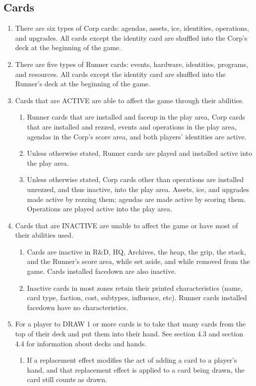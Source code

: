 \subsection{Cards}
\begin{enumerate}
	\item There are six types of Corp cards: agendas, assets, ice, identities, operations, and upgrades. All cards except the identity card are shuffled into the Corp's deck at the beginning of the game.
	\item There are five types of Runner cards: events, hardware, identities, programs, and resources. All cards except the identity card are shuffled into the Runner's deck at the beginning of the game.
	\item Cards that are ACTIVE are able to affect the game through their abilities.
	      \begin{enumerate}
		      \item Runner cards that are installed and faceup in the play area, Corp cards that are installed and rezzed, events and operations in the play area, agendas in the Corp's score area, and both players' identities are active.
		      \item Unless otherwise stated, Runner cards are played and installed active into the play area.
		      \item Unless otherwise stated, Corp cards other than operations are installed unrezzed,	and thus inactive, into the play area. Assets, ice, and upgrades made active by rezzing them; agendas are made active by scoring them. Operations are played active into the play area.
	      \end{enumerate}
	\item Cards that are INACTIVE are unable to affect the game or have most of their abilities	used.
	      \begin{enumerate}
		      \item Cards are inactive in R\&D, HQ, Archives, the heap, the grip, the stack, and the Runner's score area, \textcolor{Bittersweet}{while set aside,} and while removed from the game. Cards installed facedown are also inactive.
		      \item Inactive cards in most zones retain their printed characteristics (name, card type, faction, cost, subtypes, influence, etc). Runner cards installed facedown have no characteristics.
	      \end{enumerate}
	\item \textcolor{Bittersweet}{For a player to DRAW 1 or more cards is to take that many cards from the top of their deck and put them into their hand. See section 4.3 and section 4.4 for information about decks and hands.}
	\begin{enumerate}
		\item If a replacement effect modifies the act of adding a card to a player’s hand,	and that replacement effect is applied to a card being drawn, the card still counts as drawn.


\end{enumerate}
\end{enumerate}
